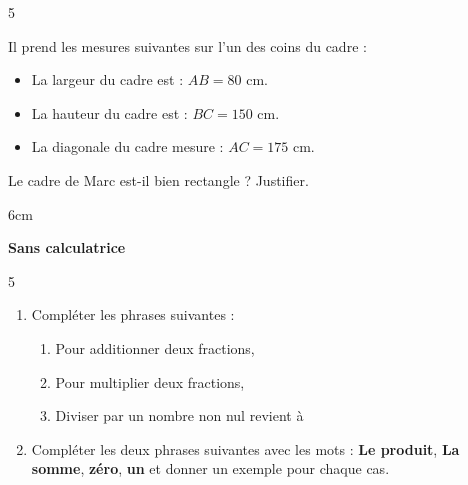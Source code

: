 \documentclass[a4paper]{book}
\begin{document}
{\begin{exerciceNote}{5}
\begin{enumerate}[leftmargin=*]
            Il prend les mesures suivantes sur l'un des coins du cadre :
            \begin{itemize}
                \item La largeur du cadre est : $AB = 80$ cm.
                \item La hauteur du cadre est : $BC = 150$ cm.
                \item La diagonale du cadre mesure : $AC = 175$ cm.
            \end{itemize}
            
            Le cadre de Marc est-il bien rectangle ? Justifier.

            \begin{ZoneReponse}{6cm}\end{ZoneReponse}
        \end{enumerate}      
    \end{exerciceNote}


\setcounter{exo}{1}
\NomPrenom
{}
\TableauCompetencesTrois
            {\CompetenceSept}
            {}
            {}
            
\textbf{Sans calculatrice}


    \begin{exerciceNote}{5}
        \begin{enumerate}
            \item Compléter les phrases suivantes :
    
            \begin{enumerate}
                \item Pour additionner deux fractions, \dotfill

                \medskip \dotfill \medskip
    
                \item Pour multiplier deux fractions,  \dotfill

                \medskip \dotfill \medskip
    
                \item Diviser par un nombre non nul revient à  \dotfill

                \medskip
            \end{enumerate}
    
            \item Compléter les deux phrases suivantes avec les mots : \textbf{Le produit}, \textbf{La somme}, \textbf{zéro}, \textbf{un} et donner un exemple pour chaque cas.


\end{enumerate}
\end{exerciceNote}}
\end{document}
